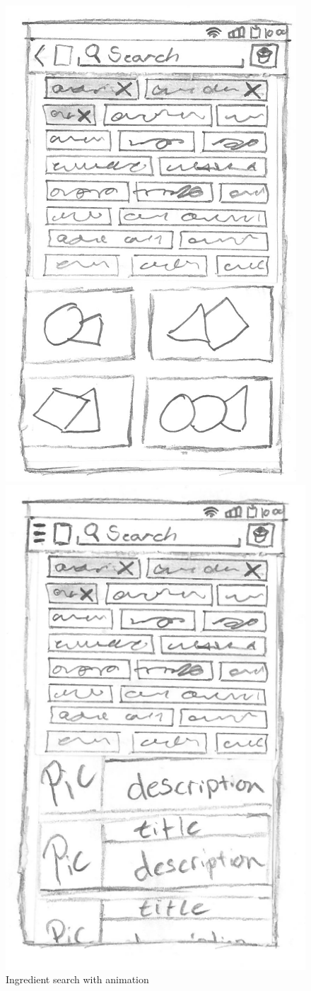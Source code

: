 \begin{figure}[H]
\begin{minipage}[b]{0.5\columnwidth}
\centering
\includegraphics[width=0.7\columnwidth]{img/prototypes/ingredient_search_animation.pdf}
\caption{Ingredient search with animation\label{fig:ingreani}}
\end{minipage}
\hspace{0.5cm}
\begin{minipage}[b]{0.5\columnwidth}
\centering
\includegraphics[width=0.7\columnwidth]{img/prototypes/recipe_browse.pdf}

\end{minipage}
\end{figure}
